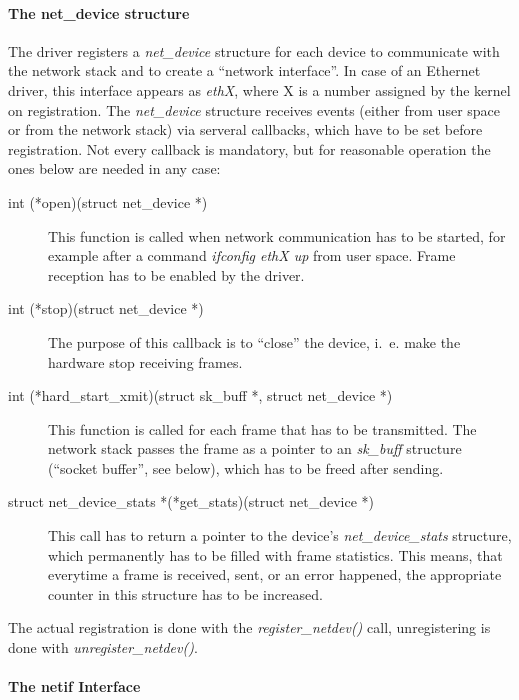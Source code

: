 \documentclass[a4paper,12pt,BCOR6mm,bibtotoc,idxtotoc]{scrbook}
\begin{document}
\paragraph{The net\_device structure}

The driver registers a \textit{net\_device} structure for each device
to communicate with the network stack and to create a ``network
interface''. In case of an Ethernet driver, this interface appears as
\textit{ethX}, where X is a number assigned by the kernel on
registration. The \textit{net\_device} structure receives events
(either from user space or from the network stack) via serveral
callbacks, which have to be set before registration. Not every
callback is mandatory, but for reasonable operation the ones below are
needed in any case:

\begin{description}
\item[int (*open)(struct net\_device *)] This function is called when
  network communication has to be started, for example after a command
  \textit{ifconfig ethX up} from user space. Frame reception has to be
  enabled by the driver.
\item[int (*stop)(struct net\_device *)] The purpose of this callback
  is to ``close'' the device, i.~e. make the hardware stop receiving
  frames.
\item[int (*hard\_start\_xmit)(struct sk\_buff *, struct net\_device
  *)] This function is cal\-led for each frame that has to be
  transmitted.  The network stack passes the frame as a pointer to an
  \textit{sk\_buff} structure (``socket buffer'',
  see below), which has to be freed after sending.
\item[struct net\_device\_stats *(*get\_stats)(struct net\_device *)]
  This call has to return a pointer to the device's
  \textit{net\_device\_stats} structure, which permanently has to be
  filled with frame statistics. This means, that everytime a frame is
  received, sent, or an error happened, the appropriate counter in
  this structure has to be increased.
\end{description}

The actual registration is done with the \textit{register\_netdev()}
call, unregistering is done with \textit{unregister\_netdev()}.

\paragraph{The netif Interface}
\end{document}
